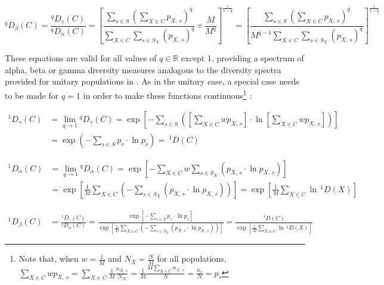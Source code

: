 \begin{equation}
^qD_\beta(C) = \frac{^qD_\gamma(C)}{^qD_\alpha(C)}
= \left[
\frac{\displaystyle\sum_{s \in S}\left(\sum_{X \in C} p_{X,\,s}\right)^q}{\displaystyle \sum_{X \in C}\sum_{s \in S_X} (p_{X,\,s})^q}
\times
\frac{\displaystyle M}{\displaystyle M^q}
\right]^\frac{1}{1-q}
= \left[
\frac{\displaystyle\sum_{s \in S}\left(\sum_{X \in C} p_{X,\,s}\right)^q}{\displaystyle M^{q-1} \sum_{X \in C}\sum_{s \in S_X} (p_{X,\,s})^q}
\right]^\frac{1}{1-q}
\label{eq:diversity_beta_even}
\end{equation}

\noindent These equations are valid for all values of $q \in \mathbb{R}$ except 1, providing a spectrum of alpha, beta or gamma diversity measures analogous to the diversity spectra provided for unitary populations in . As in the unitary case, a special case needs to be made for $q = 1$ in order to make these functions continuous\footnote{Note that, when $w = \frac{1}{M}$ and $N_X = \frac{N}{M}$ for all populations, $\displaystyle\sum_{X \in C}wp_{X,\,s} = \sum_{X \in C}\frac{1}{M}\frac{n_{X,\,s}}{N_X} = \frac{1}{M}\frac{M \sum_{X \in C} n_{X,\,s}}{N} = \frac{n_{s}}{N} = p_s$} \parencite{jost2007partitioning}:

\begin{equation}
\begin{split}
^1D_\gamma(C) & = \lim_{q \to 1} {^qD}_\gamma(C)
= \exp\left[-\sum_{s \in S}\left(\left[\sum_{X \in C}wp_{X,\,s}\right]\cdot\ln \left[\sum_{X \in C}wp_{X,\,s}\right]\right)\right]\\
& = \exp\left(-\sum_{s \in S}p_s \cdot\ln p_s\right) =\:^1D(C)
\end{split}
\label{eq:diversity_gamma_q1}
\end{equation}

\begin{equation}
\begin{split}
^1D_\alpha(C) & = \lim_{q \to 1} {^qD}_\alpha(C)
= \exp\left[-\sum_{X \in C}w\sum_{s \in S_X}(p_{X,\,s}\cdot\ln p_{X,\,s})\right]\\
 & = \exp\left[\frac{1}{M}\sum_{X \in C}\left(-\sum_{s \in S_X}(p_{X,\,s}\cdot\ln p_{X,\,s})\right)\right] = \exp\left[\frac{1}{M}\sum_{X \in C}\ln\,^1D(X)\right]
\end{split}
\label{eq:diversity_alpha_q1}
\end{equation}

\begin{equation}
\begin{split}
^1D_\beta(C) & = \frac{^1D_\gamma(C)}{^1D_\alpha(C)} = \frac{\exp\left[-\sum_{s \in S}p_s \cdot\ln p_s\right]}{\exp\left[\frac{1}{M}\sum_{X \in C}\left(-\sum_{s \in S_X}(p_{X,\,s}\cdot\ln p_{X,\,s})\right)\right]} = \frac{^1D(C)}{\exp\left[\frac{1}{M}\sum_{X \in C}\ln\,^1D(X)\right]}
\end{split}
\label{eq:diversity_beta_q1}
\end{equation}


